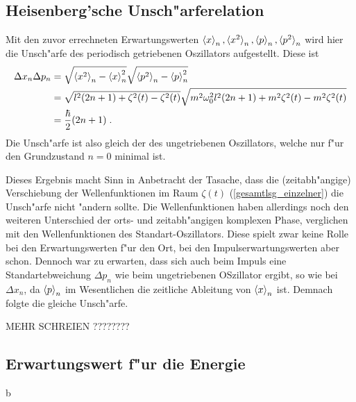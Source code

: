   \subsection{Heisenberg'sche Unsch"arferelation}
    Mit den zuvor errechneten Erwartungswerten $\braket{x}_n,\braket{x^2}_n,\braket{p}_n,\braket{p^2}_n$ wird hier die Unsch"arfe des periodisch getriebenen Oszillators aufgestellt.
    Diese ist
    \begin{align}
      \Delta x_n\Delta p_n &= \sqrt{\braket{x^2}_n-\braket{x}^2_n}\sqrt{\braket{p^2}_n-\braket{p}^2_n} \notag\\
      &= \sqrt{l^2(2n+1)+\zeta^2(t)-\zeta^2(t)}\sqrt{m^2\omega^2_0l^2(2n+1)+m^2\zeta^2(t)-m^2\zeta^2(t)} \notag\\
      &= \frac{\hbar}{2}(2n+1) \; .
    \end{align}
    Die Unsch"arfe ist also gleich der des ungetriebenen Oszillators, welche nur f"ur den Grundzustand $n=0$ minimal ist.
    
    Dieses Ergebnis macht Sinn in Anbetracht der Tasache, dass die (zeitabh"angige) Verschiebung der Wellenfunktionen im Raum $\zeta(t)$ (\ref{gesamtlsg_einzelner}) die Unsch"arfe nicht "andern sollte.
    Die Wellenfunktionen haben allerdings noch den weiteren Unterschied der orts- und zeitabh"angigen komplexen Phase, verglichen mit den Wellenfunktionen des Standart-Oszillators.
    Diese spielt zwar keine  Rolle bei den Erwartungswerten f"ur den Ort, bei den Impulserwartungswerten aber schon.
    Dennoch war zu erwarten, dass sich auch beim Impuls eine Standartebweichung $\Delta p_n$ wie beim ungetriebenen OSzillator ergibt, so wie bei $\Delta x_n$, da $\braket{p}_n$ im Wesentlichen die zeitliche Ableitung von $\braket{x}_n$ ist.
    Demnach folgte die gleiche Unsch"arfe.

    MEHR SCHREIEN ????????


  \subsection{Erwartungswert f"ur die Energie}




















































   b

